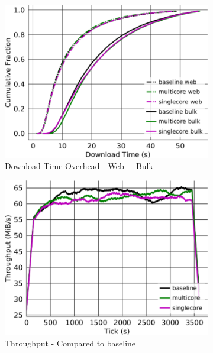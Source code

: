 \begin{figure}[t] \centering
  \begin{subfigure}[t]{0.32\textwidth} \centering
    \includegraphics[clip, width=1.0\textwidth]{images/overhead_downloadtime.pdf} \caption{Download Time Overhead - Web + Bulk}
    \label{fig:overhead_ttlastbyte}
  \end{subfigure}
  \begin{subfigure}[t]{0.32\textwidth} \centering
    \includegraphics[clip, width=1.0\textwidth]{images/overhead_throughput.pdf}
    \caption{Throughput - Compared to baseline}
    \label{fig:overhead_throughput}
  \end{subfigure}
  \begin{subfigure}[t]{0.32\textwidth} \centering

\end{subfigure}
\end{figure}
